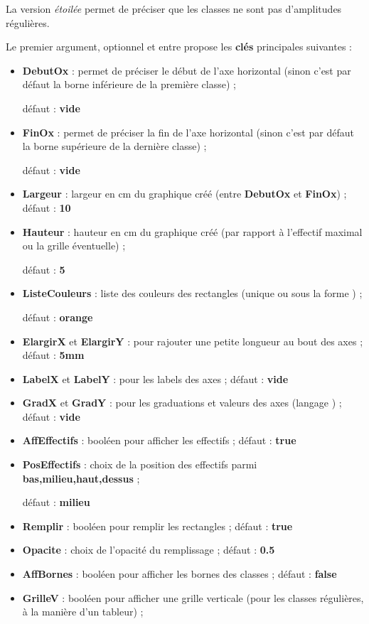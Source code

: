 \documentclass[a4paper,french,11pt]{article}
\newcommand\ctex[1]{\tcbox[vignettelatex]{#1}}
\newcommand\Cle[1]{{\bfseries\sffamily\textlangle \textcolor{orange!75!black}{#1}\textrangle}}
\begin{document}
\begin{cautionblock}
La version \textit{étoilée} permet de préciser que les classes ne sont pas d'amplitudes régulières.

\medskip

Le premier argument, optionnel et entre \ctex{[...]} propose les \Cle{clés} principales suivantes :

\begin{itemize}
	\item \Cle{DebutOx} : permet de préciser le début de l'axe horizontal (sinon c'est par défaut la borne inférieure de la première classe) ;
	
	\hfill{}défaut : \Cle{vide}
	\item \Cle{FinOx} : permet de préciser la fin de l'axe horizontal (sinon c'est par défaut la borne supérieure de la dernière classe) ;
	
	\hfill{}défaut : \Cle{vide}
	\item \Cle{Largeur} : largeur en cm du graphique créé (entre \Cle{DebutOx} et \Cle{FinOx}) ; \hfill{}défaut : \Cle{10}
	\item \Cle{Hauteur} : hauteur en cm du graphique créé (par rapport à l'effectif maximal ou la grille éventuelle) ;
	
	\hfill{}défaut : \Cle{5}
	\item \Cle{ListeCouleurs} : liste des couleurs des rectangles (unique ou sous la forme \ctex{\{CoulA,CoulB,...\}}) ;
	
	\hfill{}défaut : \Cle{orange}
	\item \Cle{ElargirX} et \Cle{ElargirY} : pour rajouter une petite longueur au bout des axes ; \hfill{}défaut : \Cle{5mm}
	\item \Cle{LabelX} et \Cle{LabelY} : pour les labels des axes ; \hfill{}défaut : \Cle{vide}
	\item \Cle{GradX} et \Cle{GradY} : pour les graduations et valeurs des axes (langage \ctex{tikz}) ; \hfill{}défaut : \Cle{vide}
	\item \Cle{AffEffectifs} : booléen pour afficher les effectifs ; \hfill{}défaut : \Cle{true}
	\item \Cle{PosEffectifs} : choix de la position des effectifs parmi \Cle{bas,milieu,haut,dessus} ;
	
	\hfill{}défaut : \Cle{milieu}
	\item \Cle{Remplir} : booléen pour remplir les rectangles ; \hfill{}défaut : \Cle{true}
	\item \Cle{Opacite} : choix de l'opacité du remplissage ; \hfill{}défaut : \Cle{0.5}
	\item \Cle{AffBornes} : booléen pour afficher les bornes des classes ; \hfill{}défaut : \Cle{false}
	\item \Cle{GrilleV} : booléen pour afficher une grille verticale (pour les classes régulières, à la manière d'un tableur) ;
	

\end{itemize}
\end{cautionblock}
\end{document}
